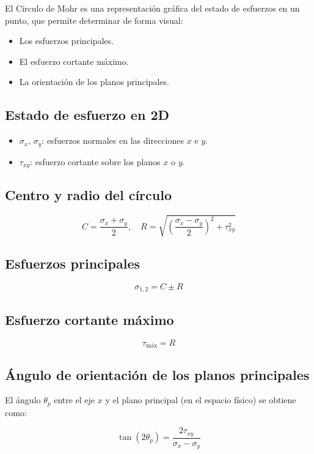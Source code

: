 \documentclass{article} %
\begin{document}
El Círculo de Mohr es una representación gráfica del estado de esfuerzos en un punto, que permite determinar de forma visual:
\begin{itemize}
    \item Los esfuerzos principales.
    \item El esfuerzo cortante máximo.
    \item La orientación de los planos principales.
\end{itemize}

\subsection*{Estado de esfuerzo en 2D}

\begin{itemize}
    \item $\sigma_x$, $\sigma_y$: esfuerzos normales en las direcciones $x$ e $y$.
    \item $\tau_{xy}$: esfuerzo cortante sobre los planos $x$ o $y$.
\end{itemize}

\subsection*{Centro y radio del círculo}

\[
C = \frac{\sigma_x + \sigma_y}{2}, \quad
R = \sqrt{\left( \frac{\sigma_x - \sigma_y}{2} \right)^2 + \tau_{xy}^2}
\]

\subsection*{Esfuerzos principales}

\[
\sigma_{1,2} = C \pm R
\]

\subsection*{Esfuerzo cortante máximo}

\[
\tau_{\text{máx}} = R
\]

\subsection*{Ángulo de orientación de los planos principales}

El ángulo $\theta_p$ entre el eje $x$ y el plano principal (en el espacio físico) se obtiene como:

\[
\tan(2\theta_p) = \frac{2\tau_{xy}}{\sigma_x - \sigma_y}
\]
\end{document}
